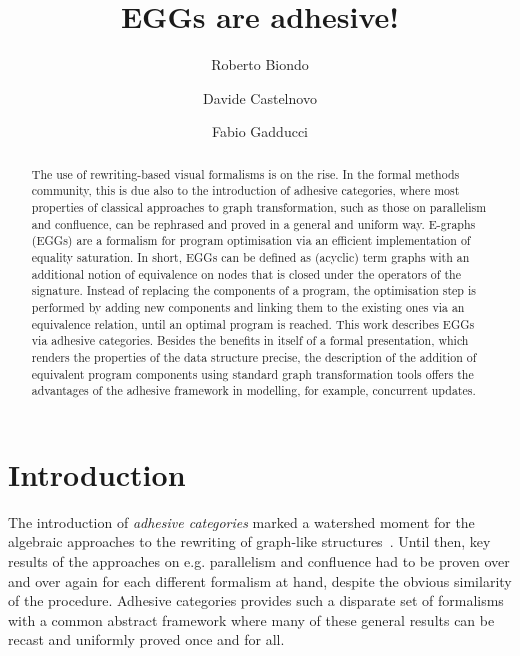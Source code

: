 \documentclass[a4paper,UKenglish,cleveref,pdftex,thm-restate,numberwithinsect]{lipics-v2021}
\title{EGGs are adhesive!}
\author{Roberto Biondo}
{Department of Computer Science, University of Pisa, Pisa, IT}
{r.biondo@studenti.unipi.it}{}{}
\author{Davide Castelnovo}
{Department of Computer Science, University of Pisa, Pisa, IT}
{castelnovod@gmail.com}
{https://orcid.org/0000-0002-5926-5615}{}
\author{Fabio Gadducci}
{Department of Computer Science, University of Pisa, Pisa, IT}
{fabio.gadducci@unipi.it}
{https://orcid.org/0000-0003-0690-3051}{}
\begin{document}
\maketitle

\begin{abstract}
The use of rewriting-based visual formalisms is on the rise. 
%
In the formal methods community, this is due also to the introduction of adhesive
categories, where most properties of classical approaches to graph transformation, 
such as those on parallelism and confluence, can be rephrased and proved in a general and 
uniform way.
%
E-graphs (EGGs) are a formalism for program optimisation 
via an efficient implementation of equality saturation. 
In short, EGGs can be  defined as (acyclic) term graphs with an additional notion of 
equivalence on nodes that is closed under the operators of the signature.
Instead of replacing the components of a program, the optimisation step 
is performed by adding new components and linking them to 
the existing ones via an equivalence relation, until an optimal program is reached.
%
This work describes EGGs via adhesive categories. 
Besides the benefits in itself of a formal presentation, which renders the 
properties of the data structure precise, the description of the addition of equivalent 
program components using standard graph transformation tools offers the advantages 
of the adhesive framework in modelling, for example, concurrent updates.
%
\end{abstract}


\section{Introduction}
The introduction of \emph{adhesive categories} marked a watershed moment for the algebraic approaches 
to the rewriting of graph-like structures~\cite{lack2005adhesive,ehrig2006fundamentals}.
%
Until then, key results of the approaches on e.g. parallelism and confluence had to be proven 
over and over again for each different formalism at hand, %
despite the obvious similarity of the procedure.
%
Adhesive categories provides such a disparate set of formalisms with a common abstract framework 
where many of these general results can be recast and uniformly proved once and for all.
 
\end{document}
